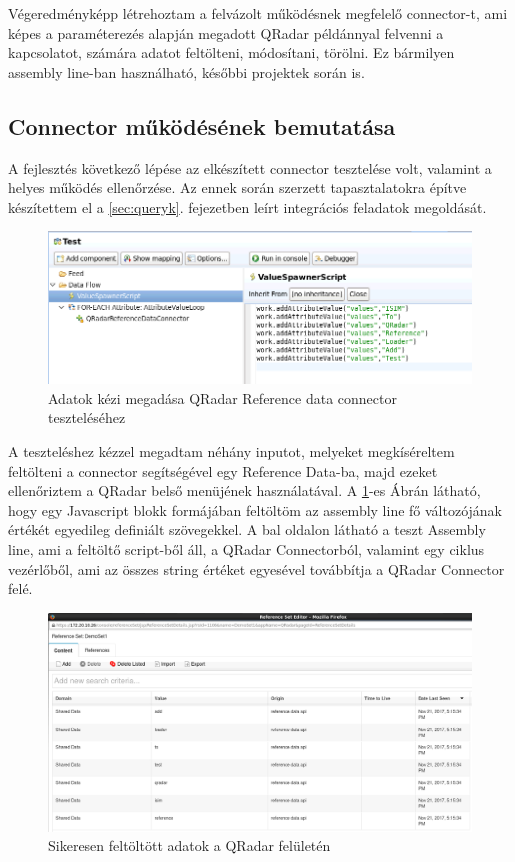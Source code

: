 Végeredményképp létrehoztam a felvázolt működésnek megfelelő connector-t, ami képes a paraméterezés alapján megadott QRadar példánnyal felvenni a kapcsolatot, számára adatot feltölteni, módosítani, törölni. Ez bármilyen assembly line-ban használható, későbbi projektek során is.

\subsection{Connector működésének bemutatása}
A fejlesztés következő lépése az elkészített connector tesztelése volt, valamint a helyes működés ellenőrzése. Az ennek során szerzett tapasztalatokra építve készítettem el a \ref{sec:queryk}.  fejezetben leírt integrációs feladatok megoldását.
 \begin{figure}[t]
	\centering
	
	\includegraphics[width=1.0\linewidth]{figures/conn_test/connTest1}
	\caption{Adatok kézi megadása QRadar Reference data connector teszteléséhez}
	\label{fig:conntest1}
\end{figure}
A teszteléshez kézzel megadtam néhány inputot, melyeket megkíséreltem feltölteni a connector segítségével egy Reference Data-ba, majd ezeket ellenőriztem a QRadar belső menüjének használatával.
A  \ref{fig:conntest1}-es Ábrán látható, hogy egy Javascript blokk formájában feltöltöm az assembly line fő változójának értékét egyedileg definiált szövegekkel. A bal oldalon látható a teszt Assembly line, ami a feltöltő script-ből áll, a QRadar Connectorból, valamint egy ciklus vezérlőből, ami az összes string értéket egyesével továbbítja a QRadar Connector felé. 
 
 \begin{figure}
 	\centering
 	\includegraphics[width=1.0\linewidth]{figures/conn_test/qradarTest1}
 	\caption{Sikeresen feltöltött adatok a QRadar felületén}
 	\label{fig:qradartest1}
 \end{figure}
 
